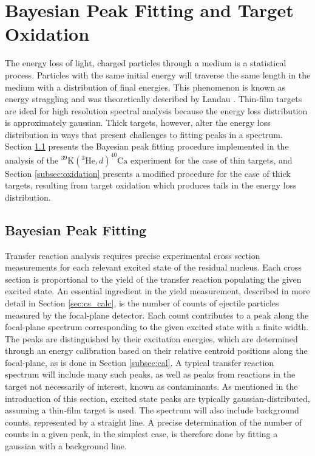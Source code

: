 \section{Bayesian Peak Fitting and Target Oxidation} \label{sec:peak_fitting}

The energy loss of light, charged particles through a medium is a statistical process. Particles with the same initial energy will traverse the same length in the medium with a distribution of final energies. This phenomenon is known as energy straggling and was theoretically described by Landau \cite{Landau}. Thin-film targets are ideal for high resolution spectral analysis because the energy loss distribution is approximately gaussian. Thick targets, however, alter the energy loss distribution in ways that present challenges to fitting peaks in a spectrum. Section \ref{subsec:peak_fitting_gaus} presents the Bayesian peak fitting procedure implemented in the analysis of the $^{39}\mathrm{K}(^{3}\mathrm{He}, d)^{40}\mathrm{Ca}$ experiment for the case of thin targets, and Section \ref{subsec:oxidation} presents a modified procedure for the case of thick targets, resulting from target oxidation which produces tails in the energy loss distribution.

\subsection{Bayesian Peak Fitting} \label{subsec:peak_fitting_gaus}

Transfer reaction analysis requires precise experimental cross section measurements for each relevant excited state of the residual nucleus. Each cross section is proportional to the yield of the transfer reaction populating the given excited state. An essential ingredient in the yield measurement, described in more detail in Section \ref{sec:cs_calc}, is the number of counts of ejectile particles measured by the focal-plane detector. Each count contributes to a peak along the focal-plane spectrum corresponding to the given excited state with a finite width. The peaks are distinguished by their excitation energies, which are determined through an energy calibration based on their relative centroid positions along the focal-plane, as is done in Section \ref{subsec:cal}. A typical transfer reaction spectrum will include many such peaks, as well as peaks from reactions in the target not necessarily of interest, known as contaminants. As mentioned in the introduction of this section, excited state peaks are typically gaussian-distributed, assuming a thin-film target is used. The spectrum will also include background counts, represented by a straight line. A precise determination of the number of counts in a given peak, in the simplest case, is therefore done by fitting a gaussian with a background line.

